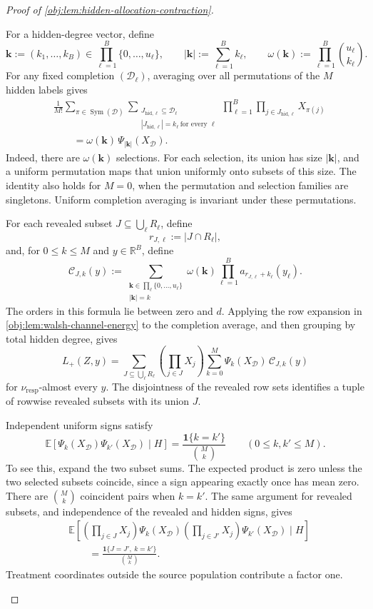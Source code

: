 \documentclass[11pt]{article}
\begin{document}
\begin{proof}[Proof of \cref{obj:lem:hidden-allocation-contraction}]
\begin{enumerate}
For a hidden-degree vector, define
\[
\boldsymbol k:=(k_1,\ldots,k_B)
\in\prod_{\ell=1}^B\{0,\ldots,u_\ell\},
\qquad
|\boldsymbol k|:=\sum_{\ell=1}^B k_\ell,
\qquad
\omega(\boldsymbol k):=\prod_{\ell=1}^B\binom{u_\ell}{k_\ell}.
\]
For any fixed completion \((\mathcal D_\ell)\), averaging over all permutations of the \(M\) hidden labels gives
\[
\begin{aligned}
&\frac1{M!}\sum_{\pi\in\operatorname{Sym}(\mathcal D)}
\sum_{\substack{
J_{\mathrm{hid},\ell}\subseteq\mathcal D_\ell\\
|J_{\mathrm{hid},\ell}|=k_\ell\ \text{for every }\ell}}
\prod_{\ell=1}^B
\prod_{j\in J_{\mathrm{hid},\ell}}X_{\pi(j)}
\\
&\qquad=
\omega(\boldsymbol k)\,
\Psi_{|\boldsymbol k|}(X_{\mathcal D}).
\end{aligned}
\]
Indeed, there are \(\omega(\boldsymbol k)\) selections. For each selection, its union has size \(|\boldsymbol k|\), and a uniform permutation maps that union uniformly onto subsets of this size. The identity also holds for \(M=0\), when the permutation and selection families are singletons. Uniform completion averaging is invariant under these permutations.

For each revealed subset \(J\subseteq\bigcup_\ell R_\ell\), define
\[
r_{J,\ell}:=|J\cap R_\ell|,
\]
and, for \(0\le k\le M\) and \(y\in\mathbb R^B\), define
\[
\mathcal C_{J,k}(y)
:=
\sum_{\substack{
\boldsymbol k\in\prod_\ell\{0,\ldots,u_\ell\}\\
|\boldsymbol k|=k}}
\omega(\boldsymbol k)
\prod_{\ell=1}^B a_{r_{J,\ell}+k_\ell}(y_\ell).
\]
The orders in this formula lie between zero and \(d\).
Applying the row expansion in \cref{obj:lem:walsh-channel-energy} to the completion average, and then grouping by total hidden degree, gives
\[
L_+(Z,y)
=
\sum_{J\subseteq\bigcup_\ell R_\ell}
\left(\prod_{j\in J}X_j\right)
\sum_{k=0}^M
\Psi_k(X_{\mathcal D})\,\mathcal C_{J,k}(y)
\]
for \(\nu_{\mathrm{resp}}\)-almost every \(y\). The disjointness of the revealed row sets identifies a tuple of rowwise revealed subsets with its union \(J\).

Independent uniform signs satisfy
\[
\mathbb E\!\left[
\Psi_k(X_{\mathcal D})\Psi_{k'}(X_{\mathcal D})
\mid H
\right]
=
\frac{\mathbf1\{k=k'\}}{\binom Mk}
\qquad(0\le k,k'\le M).
\]
To see this, expand the two subset sums. The expected product is zero unless the two selected subsets coincide, since a sign appearing exactly once has mean zero. There are \(\binom Mk\) coincident pairs when \(k=k'\). The same argument for revealed subsets, and independence of the revealed and hidden signs, gives
\[
\begin{aligned}
&\mathbb E\!\left[
\left(\prod_{j\in J}X_j\right)\Psi_k(X_{\mathcal D})
\left(\prod_{j\in J'}X_j\right)\Psi_{k'}(X_{\mathcal D})
\mid H
\right]
\\
&\qquad=
\frac{\mathbf1\{J=J',\ k=k'\}}{\binom Mk}.
\end{aligned}
\]
Treatment coordinates outside the source population contribute a factor one.


\end{enumerate}
\end{proof}
\end{document}
